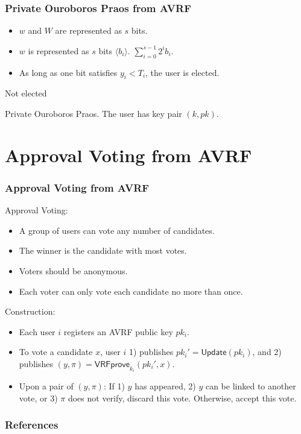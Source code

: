 \documentclass{beamer}
\begin{document}
\begin{frame}
\frametitle{Private Ouroboros Praos from AVRF}

\begin{itemize}
    \item $w$ and $W$ are represented as $s$ bits.
    \item $w$ is represented as $s$ bits $\langle b_i \rangle$. $\sum_{i=0}^{s-1} 2^i b_i$.
    \item As long as one bit satisfies $y_i < T_i$, the user is elected.
\end{itemize}

\begin{algorithm}[H]
    \DontPrintSemicolon
    Not elected\;
    \caption{Private Ouroboros Praos. The user has key pair $(k, pk)$.}
\end{algorithm}

\end{frame}




\section{Approval Voting from AVRF}

\begin{frame}
\frametitle{Approval Voting from AVRF}

Approval Voting:
\begin{itemize}
    \item A group of users can vote any number of candidates.
    \item The winner is the candidate with most votes.
    \item Voters should be anonymous.
    \item Each voter can only vote each candidate no more than once.
\end{itemize}

Construction:
\begin{itemize}
    \item Each user $i$ registers an AVRF public key $pk_i$.
    \item To vote a candidate $x$, user $i$ 1) publishes $pk_i' = \mathsf{Update}(pk_i)$, and 2) publishes $(y, \pi) = \mathsf{VRFprove}_{k_i}(pk_i', x)$.
    \item Upon a pair of $(y, \pi)$: If 1) $y$ has appeared, 2) $y$ can be linked to another vote, or 3) $\pi$ does not verify, discard this vote. Otherwise, accept this vote.
\end{itemize}

\end{frame}

\begin{frame}[allowframebreaks]
    \frametitle{References}
    
    \tiny
\end{frame}
\end{document}
